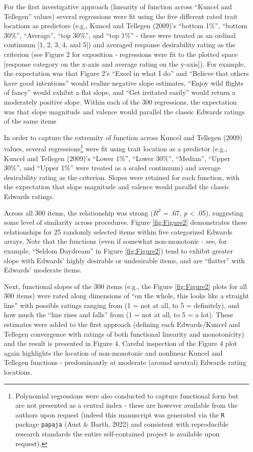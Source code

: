 \documentclass[
  ,jou]{apa6}
\begin{document}
For the first investigative approach (linearity of function across ``Kuncel and Tellegen'' values) several regressions were fit using the five different rated trait locations as predictors (e.g., Kuncel and Tellegen (2009)'s ``bottom 1\%'', ``bottom 30\%'', ``Average'', ``top 30\%'', and ``top 1\%'' - these were treated as an ordinal continuum {[}1, 2, 3, 4, and 5{]}) and averaged response desirability rating as the criterion (see Figure 2 for exposition - regressions were fit to the plotted space {[}response category on the x-axis and average rating on the y-axis{]}). For example, the expectation was that Figure 2's ``Excel in what I do'' and ``Believe that others have good intentions'' would realize negative slope estimates, ``Enjoy wild flights of fancy'' would exhibit a flat slope, and ``Get irritated easily'' would return a moderately positive slope. Within each of the 300 regressions, the expectation was that slope magnitude and valence would parallel the classic Edwards ratings of the same items

In order to capture the extremity of function across Kuncel and Tellegen (2009) values, several regressions\footnote{Polynomial regressions were also conducted to capture functional form but are not presented as a central index - these are however available from the authors upon request (indeed this manuscript was generated via the \texttt{R} package \texttt{papaja} (Aust \& Barth, 2022) and consistent with reproducible research standards the entire self-contained project is available upon request).} were fit using trait location as a predictor (e.g., Kuncel and Tellegen (2009)'s ``Lower 1\%'', ``Lower 30\%'', ``Median'', ``Upper 30\%'', and ``Upper 1\%'' were treated as a scaled continuum) and average desirability rating as the criterion. Slopes were retained for each function, with the expectation that slope magnitude and valence would parallel the classic Edwards ratings.

Across all 300 items, the relationship was strong (\(R^2\) = .67, \emph{p} \textless{} .05), suggesting some level of similarity across procedures. Figure \ref{fig:Figure2} demonstrates these relationships for 25 randomly selected items within five categorized Edwards arrays. Note that the functions (even if somewhat non-monotonic - see, for example, ``Seldom Daydream'' in Figure \ref{fig:Figure2}) tend to exhibit greater slope with Edwards' highly desirable or undesirable items, and are ``flatter'' with Edwards' moderate items.

Next, functional slopes of the 300 items (e.g., the Figure \ref{fig:Figure2} plots for all 300 items) were rated along dimensions of ``on the whole, this looks like a straight line'' with possible ratings ranging from (1 = not at all, to 5 = definitely), and how much the ``line rises and falls'' from (1 = not at all, to 5 = a lot). These estimates were added to the first approach (defining each Edwards/Kuncel and Tellegen convergence with ratings of both functional linearity and monotonicity) and the result is presented in Figure 4. Careful inspection of the Figure 4 plot again highlights the location of non-monotonic and nonlinear Kuncel and Tellegen functions - predominantly at moderate (around neutral) Edwards rating locations.
\end{document}
